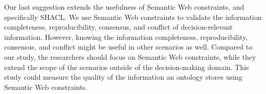 Our last suggestion extends the usefulness of Semantic Web constraints, and specifically SHACL. We use Semantic Web constraints to validate the information completeness, reproducibility, consensus, and conflict of decision-relevant information. However, knowing the information completeness, reproducibility, consensus, and conflict might be useful in other scenarios as well. Compared to our study, the researchers should focus on Semantic Web constraints, while they extend the scope of the scenarios outside of the decision-making domain. This study could measure the quality of the information an ontology stores using Semantic Web constraints.